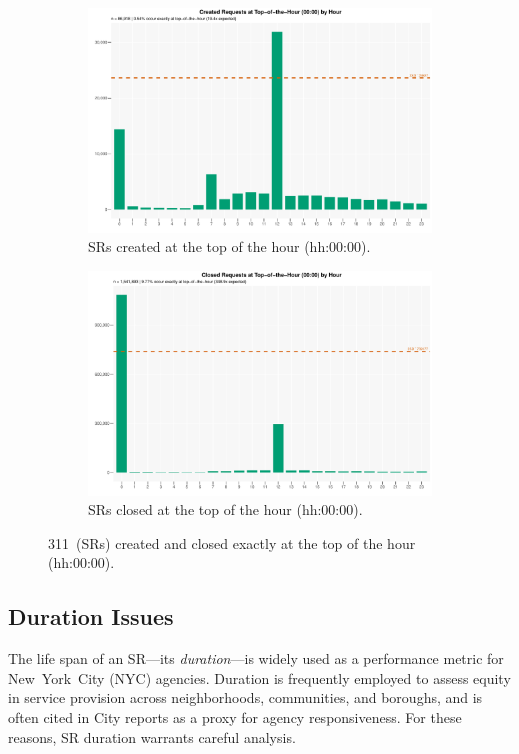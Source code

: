 \documentclass[linenumber]{jdsart}
\begin{document}
\begin{figure}[tbp]
  \centering
  \begin{subfigure}[b]{0.48\textwidth}
    \includegraphics[width=\textwidth]{created_top_of_hour_distribution.pdf}
    \caption{SRs created at the top of the hour (hh{:}00{:}00).}
    \label{fig:created_top_hour}
  \end{subfigure}
  \hfill
  \begin{subfigure}[b]{0.48\textwidth}
    \includegraphics[width=\textwidth]{closed_top_of_hour_distribution.pdf}
    \caption{SRs closed at the top of the hour (hh{:}00{:}00).}
    \label{fig:closed_top_hour}
  \end{subfigure}
  \caption{311~(\textsc{SR}s) created and closed exactly
  at the top of the hour (hh{:}00{:}00).}
  \label{fig:exacthours}
\end{figure}

 \subsection{Duration Issues}
\label{subsec:duration}
The life span of an \textsc{SR}—its 
\textit{duration}—is widely used as a performance metric for 
New~York~City (\textsc{NYC}) agencies. 
Duration is frequently employed to assess equity in service provision 
across neighborhoods, communities, and boroughs, and is often cited in 
City reports as a proxy for agency responsiveness. 
For these reasons, \textsc{SR} duration warrants careful analysis.  
\end{document}
